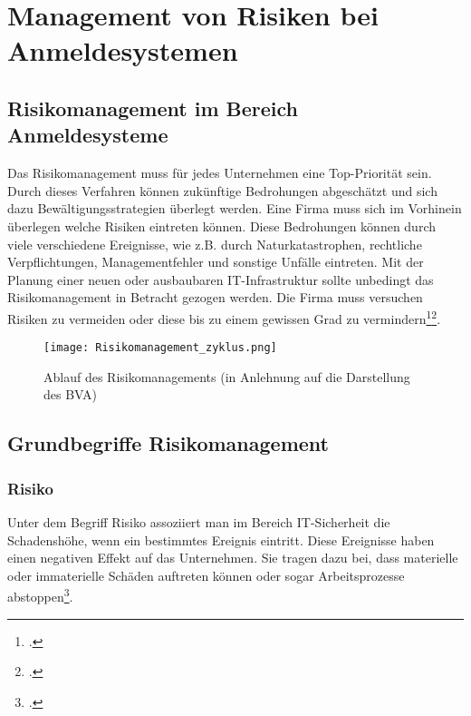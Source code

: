 \chapter{Management von Risiken bei Anmeldesystemen}
\strahlhofer

\section{Risikomanagement im Bereich Anmeldesysteme}
Das Risikomanagement muss für jedes Unternehmen eine Top-Priorität sein. Durch dieses Verfahren können zukünftige Bedrohungen abgeschätzt und sich dazu Bewältigungsstrategien überlegt werden. Eine Firma muss sich im Vorhinein überlegen welche Risiken eintreten können. Diese Bedrohungen können durch viele verschiedene Ereignisse, wie z.B. durch Naturkatastrophen, rechtliche Verpflichtungen, Managementfehler und sonstige Unfälle eintreten.
Mit der Planung einer neuen oder ausbaubaren IT-Infrastruktur sollte unbedingt das Risikomanagement in Betracht gezogen werden. Die Firma muss versuchen Risiken zu vermeiden oder diese bis zu einem gewissen Grad zu vermindern\footcite{risikomanagement-diplomarbeit}\footcite{risikomanagement}. 

\begin{center}
\begin{figure}[H]
    \centering
    \texttt{[image: Risikomanagement\_zyklus.png]}
    \caption{Ablauf des Risikomanagements (in Anlehnung auf die Darstellung des BVA)}
\end{figure}
\end{center}


\section{Grundbegriffe Risikomanagement}
\subsection{Risiko}
Unter dem Begriff Risiko assoziiert man im Bereich IT-Sicherheit die Schadenshöhe, wenn ein bestimmtes Ereignis eintritt. Diese Ereignisse haben einen negativen Effekt auf das Unternehmen. Sie tragen dazu bei, dass materielle oder immaterielle Schäden auftreten können oder sogar Arbeitsprozesse abstoppen\footcite{risikomanagement-diplomarbeit}.

